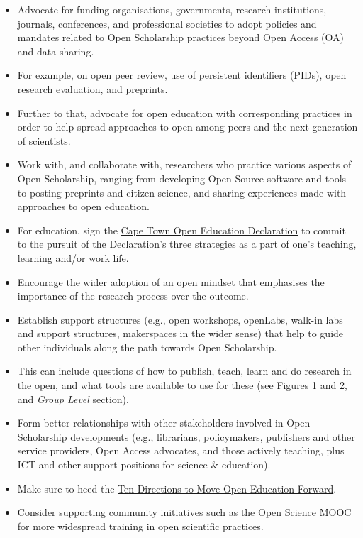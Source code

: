 \begin{itemize}
\item
  Advocate for funding organisations, governments, research
  institutions, journals, conferences, and professional societies to
  adopt policies and mandates related to Open Scholarship practices
  beyond Open Access (OA) and data sharing.
\item
  For example, on open peer review, use of persistent identifiers
  (PIDs), open research evaluation, and preprints.
\item
  Further to that, advocate for open education with corresponding
  practices in order to help spread approaches to open among peers and
  the next generation of scientists.
\item
  Work with, and collaborate with, researchers who practice various
  aspects of Open Scholarship, ranging from developing Open Source
  software and tools to posting preprints and citizen science, and
  sharing experiences made with approaches to open education.
\item
  For education, sign the
  \href{http://www.capetowndeclaration.org/sign-the-declaration}{Cape
  Town Open Education Declaration} to commit to the pursuit of the
  Declaration's three strategies as a part of one's teaching, learning
  and/or work life.
\item
  Encourage the wider adoption of an open mindset that emphasises the
  importance of the research process over the outcome.
\item
  Establish support structures (e.g., open workshops, openLabs, walk-in
  labs and support structures, makerspaces in the wider sense) that help
  to guide other individuals along the path towards Open Scholarship.
\item
  This can include questions of how to publish, teach, learn and do
  research in the open, and what tools are available to use for these
  (see Figures 1 and 2, and \emph{Group Level} section).
\item
  Form better relationships with other stakeholders involved in Open
  Scholarship developments (e.g., librarians, policymakers, publishers
  and other service providers, Open Access advocates, and those actively
  teaching, plus ICT and other support positions for science \&
  education).
\item
  Make sure to heed the
  \href{http://www.capetowndeclaration.org/cpt10/}{Ten Directions to
  Move Open Education Forward}.
\item
  Consider supporting community initiatives such as the
  \href{https://opensciencemooc.eu/}{Open Science MOOC} for more
  widespread training in open scientific practices.
\end{itemize}

